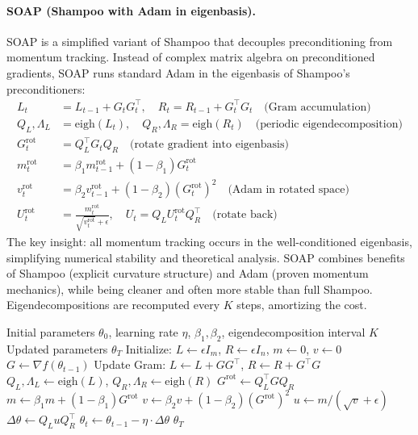 \paragraph{SOAP (Shampoo with Adam in eigenbasis).}
SOAP is a simplified variant of Shampoo that decouples preconditioning from momentum tracking. Instead of complex matrix algebra on preconditioned gradients, SOAP runs standard Adam in the eigenbasis of Shampoo's preconditioners:
\begin{align}
L_t &= L_{t-1} + G_t G_t^\top, \quad R_t = R_{t-1} + G_t^\top G_t \quad\text{(Gram accumulation)} \\
Q_L, \Lambda_L &= \text{eigh}(L_t), \quad Q_R, \Lambda_R = \text{eigh}(R_t) \quad\text{(periodic eigendecomposition)} \\
G_t^{\text{rot}} &= Q_L^\top G_t Q_R \quad\text{(rotate gradient into eigenbasis)} \\
m_t^{\text{rot}} &= \beta_1 m_{t-1}^{\text{rot}} + (1-\beta_1) G_t^{\text{rot}} \\
v_t^{\text{rot}} &= \beta_2 v_{t-1}^{\text{rot}} + (1-\beta_2)(G_t^{\text{rot}})^2 \quad\text{(Adam in rotated space)} \\
U_t^{\text{rot}} &= \frac{m_t^{\text{rot}}}{\sqrt{v_t^{\text{rot}}}+\epsilon}, \quad U_t = Q_L U_t^{\text{rot}} Q_R^\top \quad\text{(rotate back)}
\end{align}
The key insight: all momentum tracking occurs in the well-conditioned eigenbasis, simplifying numerical stability and theoretical analysis. SOAP combines benefits of Shampoo (explicit curvature structure) and Adam (proven momentum mechanics), while being cleaner and often more stable than full Shampoo. Eigendecompositions are recomputed every $K$ steps, amortizing the cost.

\begin{algorithm}[H]
\caption{SOAP (Shampoo with Adam in Eigenbasis)}
\label{alg:soap}
\begin{algorithmic}[1]
\Require Initial parameters $\theta_0$, learning rate $\eta$, $\beta_1, \beta_2$, eigendecomposition interval $K$
\Ensure Updated parameters $\theta_T$
\State Initialize: $L \gets \epsilon I_m$, $R \gets \epsilon I_n$, $m \gets 0$, $v \gets 0$
    \State $G \gets \nabla f(\theta_{t-1})$ 
    \State Update Gram: $L \gets L + G G^\top$, $R \gets R + G^\top G$
        \State $Q_L, \Lambda_L \gets \text{eigh}(L)$, $Q_R, \Lambda_R \gets \text{eigh}(R)$
    \EndIf
    \State $G^{\text{rot}} \gets Q_L^\top G Q_R$ 
    \State $m \gets \beta_1 m + (1-\beta_1) G^{\text{rot}}$ 
    \State $v \gets \beta_2 v + (1-\beta_2) (G^{\text{rot}})^2$ 
    \State $u \gets m / (\sqrt{v} + \epsilon)$ 
    \State $\Delta \theta \gets Q_L u Q_R^\top$ 
    \State $\theta_t \gets \theta_{t-1} - \eta \cdot \Delta \theta$
\EndFor
\Return $\theta_T$
\end{algorithmic}
\end{algorithm}

